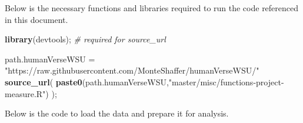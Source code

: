 \documentclass[]{article}
\newenvironment{Shaded}{\begin{snugshade}}{\end{snugshade}}
\newcommand{\CommentTok}[1]{\textcolor[rgb]{0.56,0.35,0.01}{\textit{#1}}}
\newcommand{\KeywordTok}[1]{\textcolor[rgb]{0.13,0.29,0.53}{\textbf{#1}}}
\newcommand{\NormalTok}[1]{#1}
\newcommand{\StringTok}[1]{\textcolor[rgb]{0.31,0.60,0.02}{#1}}
\begin{document}
Below is the necessary functions and libraries required to run the code
referenced in this document.

\begin{Shaded}
\begin{Highlighting}[]
\KeywordTok{library}\NormalTok{(devtools);       }\CommentTok{\# required for source\_url}

\NormalTok{path.humanVerseWSU =}\StringTok{ "https://raw.githubusercontent.com/MonteShaffer/humanVerseWSU/"}
\KeywordTok{source\_url}\NormalTok{( }\KeywordTok{paste0}\NormalTok{(path.humanVerseWSU,}\StringTok{"master/misc/functions{-}project{-}measure.R"}\NormalTok{) );}
\end{Highlighting}
\end{Shaded}

Below is the code to load the data and prepare it for analysis.
\end{document}
